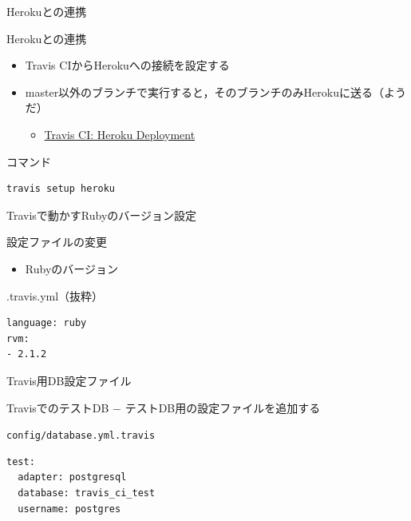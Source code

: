 \documentclass[t, aspectratio=169]{beamer}
\begin{document}
\begin{frame}[fragile,label=sec-7-3-3]{Herokuとの連携}
 \begin{block}{Herokuとの連携}
\begin{itemize}
\item Travis CIからHerokuへの接続を設定する
\item master以外のブランチで実行すると，そのブランチのみHerokuに送る（ようだ）
\begin{itemize}
\item \href{http://docs.travis-ci.com/user/deployment/heroku/}{Travis CI: Heroku Deployment}
\end{itemize}
\end{itemize}
\end{block}
\begin{block}{コマンド}
\begin{verbatim}
travis setup heroku
\end{verbatim}
\end{block}
\end{frame}

\begin{frame}[fragile,label=sec-7-3-4]{Travisで動かすRubyのバージョン設定}
 \begin{block}{設定ファイルの変更}
\begin{itemize}
\item Rubyのバージョン
\end{itemize}
\end{block}
\begin{block}{.travis.yml（抜粋）}
\begin{verbatim}
language: ruby
rvm:
- 2.1.2
\end{verbatim}
\end{block}
\end{frame}

\begin{frame}[fragile,label=sec-7-3-5]{Travis用DB設定ファイル}
 \begin{block}{TravisでのテストDB}
− テストDB用の設定ファイルを追加する
\end{block}
\begin{block}{\texttt{config/database.yml.travis}}
\begin{verbatim}
test:
  adapter: postgresql
  database: travis_ci_test
  username: postgres
\end{verbatim}
\end{block}
\end{frame}
\end{document}
